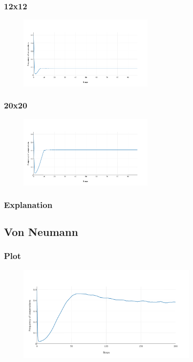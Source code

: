 \documentclass[11pt]{article}
\begin{document}
\subsubsection{12x12}

\begin{figure}[H]
\centering
   \includegraphics[width=0.6\textwidth]{img/part1/cf-moore-12-12.png}
\end{figure}

\subsubsection{20x20}

\begin{figure}[H]
\centering
   \includegraphics[width=0.6\textwidth]{img/part1/cf-moore-20-20.png}
\end{figure}

\subsubsection{Explanation}

\subsection{Von Neumann}

\subsubsection{Plot}
\begin{figure}[H]
\centering
   \includegraphics[width=0.8\textwidth]{img/part1/cf-vonn-notmyselfincluded.png}
\end{figure}
\end{document}
